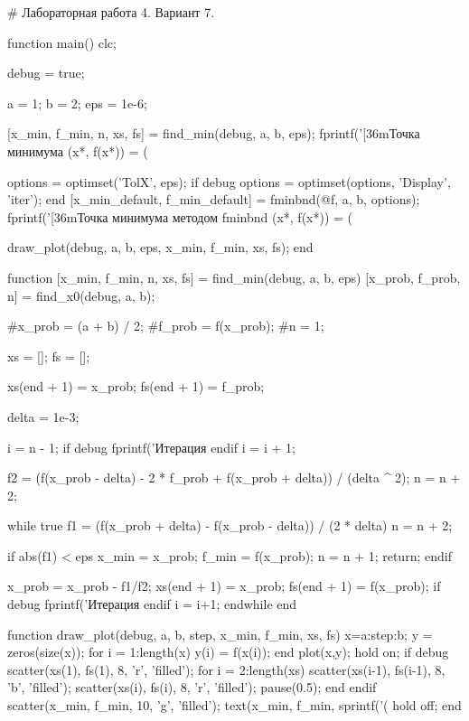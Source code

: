 # Лабораторная работа 4. Вариант 7.

function main()
  clc;

  debug = true;

  a = 1;
  b = 2;
  eps = 1e-6;

  [x_min, f_min, n, xs, fs] = find_min(debug, a, b, eps);
  fprintf('\n{}[36mТочка минимума (x*, f(x*)) = (%

  options = optimset('TolX', eps);
  if debug
    options = optimset(options, 'Display', 'iter');
  end
  [x_min_default, f_min_default] = fminbnd(@f, a, b, options);
  fprintf('\n{}[36mТочка минимума методом fminbnd (x*, f(x*)) = (%

  draw_plot(debug, a, b, eps, x_min, f_min, xs, fs);
end

function [x_min, f_min, n, xs, fs] = find_min(debug, a, b, eps)
  [x_prob, f_prob, n] = find_x0(debug, a, b);

  #x_prob = (a + b) / 2;
  #f_prob = f(x_prob);
  #n = 1;

  xs = [];
  fs = [];

  xs(end + 1) = x_prob;
  fs(end + 1) = f_prob;

  delta = 1e-3;

  i = n - 1;
  if debug
    fprintf('Итерация %
  endif
  i = i + 1;

  f2 = (f(x_prob - delta) - 2 * f_prob + f(x_prob + delta)) / (delta ^ 2);
  n = n + 2;

  while true
    f1 = (f(x_prob + delta) - f(x_prob - delta)) / (2 * delta)
    n = n + 2;

    if abs(f1) < eps
      x_min = x_prob;
      f_min = f(x_prob);
      n = n + 1;
      return;
    endif

    x_prob = x_prob - f1/f2;
    xs(end + 1) = x_prob;
    fs(end + 1) = f(x_prob);
    if debug
      fprintf('Итерация %
    endif
    i = i+1;
  endwhile
end

function draw_plot(debug, a, b, step, x_min, f_min, xs, fs)
  x=a:step:b;
  y = zeros(size(x));
  for i = 1:length(x)
      y(i) = f(x(i));
  end
  plot(x,y);
  hold on;
  if debug
    scatter(xs(1), fs(1), 8, 'r', 'filled');
    for i = 2:length(xs)
        scatter(xs(i-1), fs(i-1), 8, 'b', 'filled');
        scatter(xs(i), fs(i), 8, 'r', 'filled');
        pause(0.5);
    end
  endif
  scatter(x_min, f_min, 10, 'g', 'filled');
  text(x_min, f_min, sprintf('\n\n\n\n(%
  hold off;
end

